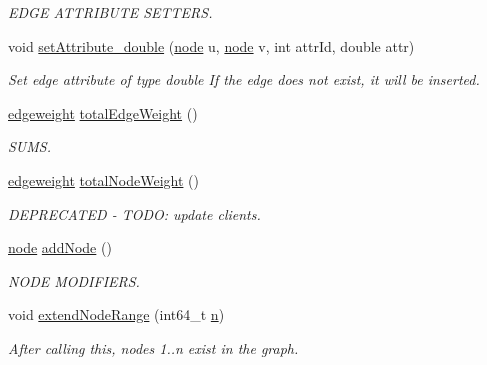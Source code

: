 \begin{DoxyCompactItemize}
\begin{DoxyCompactList}\small\item\em E\-D\-G\-E A\-T\-T\-R\-I\-B\-U\-T\-E S\-E\-T\-T\-E\-R\-S. \end{DoxyCompactList}\item 
void \hyperlink{class_networ_kit_1_1_graph_a05e6af930ba5b3ca6b74d1e3b2cffd0e}{set\-Attribute\-\_\-double} (\hyperlink{namespace_networ_kit_a61914158fd771265be48de9942369160}{node} u, \hyperlink{namespace_networ_kit_a61914158fd771265be48de9942369160}{node} v, int attr\-Id, double attr)
\begin{DoxyCompactList}\small\item\em Set edge attribute of type double If the edge does not exist, it will be inserted. \end{DoxyCompactList}\item 
\hyperlink{namespace_networ_kit_a831b108dbcd79dad062d9e28b1b4e3dd}{edgeweight} \hyperlink{class_networ_kit_1_1_graph_a8c2ee66ae18da530bca98bfd0a13ed44}{total\-Edge\-Weight} ()
\begin{DoxyCompactList}\small\item\em S\-U\-M\-S. \end{DoxyCompactList}\item 
\hyperlink{namespace_networ_kit_a831b108dbcd79dad062d9e28b1b4e3dd}{edgeweight} \hyperlink{class_networ_kit_1_1_graph_a01c5d8d5dc8ddbe3bef346d9e7a0de3c}{total\-Node\-Weight} ()
\begin{DoxyCompactList}\small\item\em D\-E\-P\-R\-E\-C\-A\-T\-E\-D -\/ T\-O\-D\-O\-: update clients. \end{DoxyCompactList}\item 
\hyperlink{namespace_networ_kit_a61914158fd771265be48de9942369160}{node} \hyperlink{class_networ_kit_1_1_graph_a6f6d56aae8ee494223164a54d30d4ea6}{add\-Node} ()
\begin{DoxyCompactList}\small\item\em N\-O\-D\-E M\-O\-D\-I\-F\-I\-E\-R\-S. \end{DoxyCompactList}\item 
void \hyperlink{class_networ_kit_1_1_graph_a9bd3b6558c856e8c5f4265aa337300d4}{extend\-Node\-Range} (int64\-\_\-t \hyperlink{class_networ_kit_1_1_graph_aae05e611d6d5eb42e045d374d73eb34a}{n})
\begin{DoxyCompactList}\small\item\em After calling this, nodes 1..n exist in the graph. \end{DoxyCompactList}\item 

\end{DoxyCompactItemize}
